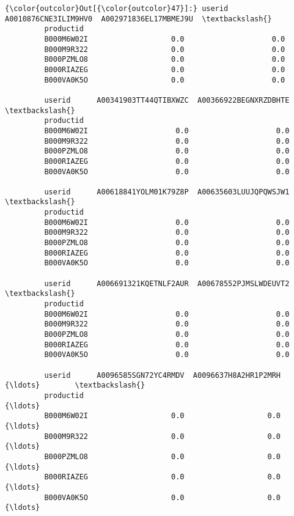 \documentclass[11pt]{article}
\begin{document}
\begin{Verbatim}[commandchars=\\\{\}]
{\color{outcolor}Out[{\color{outcolor}47}]:} userid      A0010876CNE3ILIM9HV0  A002971836EL17MBMEJ9U  \textbackslash{}
         productid                                                 
         B000M6W02I                   0.0                    0.0   
         B000M9R322                   0.0                    0.0   
         B000PZMLO8                   0.0                    0.0   
         B000RIAZEG                   0.0                    0.0   
         B000VA0K5O                   0.0                    0.0   
         
         userid      A00341903TT44QTIBXWZC  A00366922BEGNXRZDBHTE  \textbackslash{}
         productid                                                  
         B000M6W02I                    0.0                    0.0   
         B000M9R322                    0.0                    0.0   
         B000PZMLO8                    0.0                    0.0   
         B000RIAZEG                    0.0                    0.0   
         B000VA0K5O                    0.0                    0.0   
         
         userid      A00618841YOLM01K79Z8P  A00635603LUUJQPQWSJW1  \textbackslash{}
         productid                                                  
         B000M6W02I                    0.0                    0.0   
         B000M9R322                    0.0                    0.0   
         B000PZMLO8                    0.0                    0.0   
         B000RIAZEG                    0.0                    0.0   
         B000VA0K5O                    0.0                    0.0   
         
         userid      A006691321KQETNLF2AUR  A00678552PJMSLWDEUVT2  \textbackslash{}
         productid                                                  
         B000M6W02I                    0.0                    0.0   
         B000M9R322                    0.0                    0.0   
         B000PZMLO8                    0.0                    0.0   
         B000RIAZEG                    0.0                    0.0   
         B000VA0K5O                    0.0                    0.0   
         
         userid      A0096585SGN72YC4RMDV  A0096637H8A2HR1P2MRH      {\ldots}        \textbackslash{}
         productid                                                   {\ldots}         
         B000M6W02I                   0.0                   0.0      {\ldots}         
         B000M9R322                   0.0                   0.0      {\ldots}         
         B000PZMLO8                   0.0                   0.0      {\ldots}         
         B000RIAZEG                   0.0                   0.0      {\ldots}         
         B000VA0K5O                   0.0                   0.0      {\ldots}         
         

\end{Verbatim}
\end{document}
